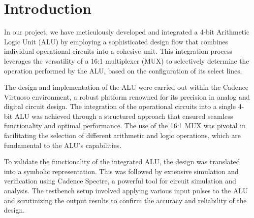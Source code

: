 \documentclass[conference]{IEEEtran}
\begin{document}
\section{Introduction}\label{A}
In our project, we have meticulously developed and integrated a 4-bit Arithmetic Logic Unit (ALU) by employing a sophisticated design flow that combines individual operational circuits into a cohesive unit. This integration process leverages the versatility of a 16:1 multiplexer (MUX) to selectively determine the operation performed by the ALU, based on the configuration of its select lines. 

The design and implementation of the ALU were carried out within the Cadence Virtuoso environment, a robust platform renowned for its precision in analog and digital circuit design. The integration of the operational circuits into a single 4-bit ALU was achieved through a structured approach that ensured seamless functionality and optimal performance. The use of the 16:1 MUX was pivotal in facilitating the selection of different arithmetic and logic operations, which are fundamental to the ALU's capabilities.

To validate the functionality of the integrated ALU, the design was translated into a symbolic representation. This was followed by extensive simulation and verification using Cadence Spectre, a powerful tool for circuit simulation and analysis. The testbench setup involved applying various input pulses to the ALU and scrutinizing the output results to confirm the accuracy and reliability of the design.
\end{document}
